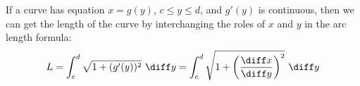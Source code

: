\begin{frame}
If a curve has equation $x = g(y)$, $c\leq y \leq d$, and $g'(y)$ is continuous, then we can get the length of the curve by interchanging the roles of $x$ and $y$ in the arc length formula:
\[
L = \int_c^d \sqrt{1+(g'(y))^2}\ \diff y = \int_c^d \sqrt{1 + \left( \frac{\diff x}{\diff y}\right)^2}\ \diff y
\]
\end{frame}
